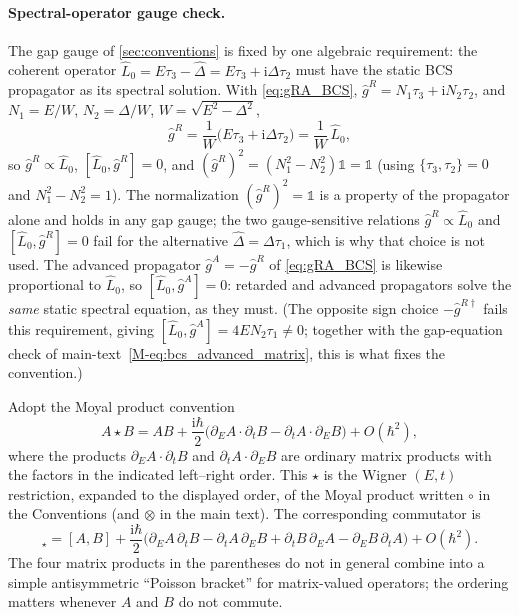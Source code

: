 \documentclass[
  aps,
  prb,
  preprint,
  superscriptaddress,
  longbibliography,
  nofootinbib
]{revtex4-2}
\newcommand{\ii}{\mathrm{i}}
\newcommand{\DOS}{N_1}
\newcommand{\hatg}{\hat{g}}
\newcommand{\hatD}{\hat{\Delta}}
\providecommand{\openone}{}\renewcommand{\openone}{\mathds{1}}
\begin{document}
\paragraph{Spectral-operator gauge check.} The gap gauge of
\cref{sec:conventions} is fixed by one algebraic requirement: the coherent
operator \(\hat L_0=E\tau_3-\hatD=E\tau_3+\ii\Delta\tau_2\) must have the
static BCS propagator as its spectral solution. With \cref{eq:gRA_BCS},
\(\hatg^{R}=\DOS\tau_3+\ii N_2\tau_2\), and \(\DOS=E/W\), \(N_2=\Delta/W\),
\(W=\sqrt{E^2-\Delta^2}\),
\begin{equation}
  \hatg^{R}=\frac{1}{W}\bigl(E\tau_3+\ii\Delta\tau_2\bigr)=\frac{1}{W}\,\hat L_0,
  \label{eq:gR_propto_L0}
\end{equation}
so \(\hatg^{R}\propto\hat L_0\), \([\hat L_0,\hatg^{R}]=0\), and
\((\hatg^{R})^2=(\DOS^2-N_2^2)\openone=\openone\) (using
\(\{\tau_3,\tau_2\}=0\) and \(\DOS^2-N_2^2=1\)). The normalization
\((\hatg^{R})^2=\openone\) is a property of the propagator alone and holds in
any gap gauge; the two gauge-sensitive relations \(\hatg^{R}\propto\hat L_0\)
and \([\hat L_0,\hatg^{R}]=0\) fail for the alternative \(\hatD=\Delta\tau_1\),
which is why that choice is not used. The advanced propagator
\(\hatg^A=-\hatg^R\) of \cref{eq:gRA_BCS} is likewise proportional to
\(\hat L_0\), so \([\hat L_0,\hatg^{A}]=0\): retarded and advanced
propagators solve the \emph{same} static spectral equation, as they must.
(The opposite sign choice \(-\hatg^{R\dagger}\) fails this requirement,
giving \([\hat L_0,\hatg^A]=4EN_2\tau_1\neq0\); together with the
gap-equation check of main-text~\cref{M-eq:bcs_advanced_matrix}, this is what fixes
the convention.)

Adopt the Moyal product convention
\begin{equation}
  A\star B
  =
  AB + \frac{\ii\hbar}{2}\bigl(\partial_E A\cdot\partial_t B
                              -\partial_t A\cdot\partial_E B\bigr)
  + O(\hbar^2),
  \label{eq:moyal_def}
\end{equation}
where the products \(\partial_E A\cdot\partial_t B\) and
\(\partial_t A\cdot\partial_E B\) are ordinary matrix products with the
factors in the indicated left--right order. This \(\star\) is the Wigner
\((E,t)\) restriction, expanded to the displayed order, of the Moyal
product written \(\circ\) in the Conventions (and \(\otimes\) in the main
text). The corresponding commutator
is
\begin{equation}
  [A,B]_{\star}
  =
  [A,B]
  +\frac{\ii\hbar}{2}\bigl(\partial_E A\,\partial_t B
                          -\partial_t A\,\partial_E B
                          +\partial_t B\,\partial_E A
                          -\partial_E B\,\partial_t A\bigr)
  + O(\hbar^2).
  \label{eq:moyal_comm}
\end{equation}
The four matrix products in the parentheses do not in general combine
into a simple antisymmetric ``Poisson bracket'' for matrix-valued
operators; the ordering matters whenever \(A\) and \(B\) do not commute.
\end{document}
